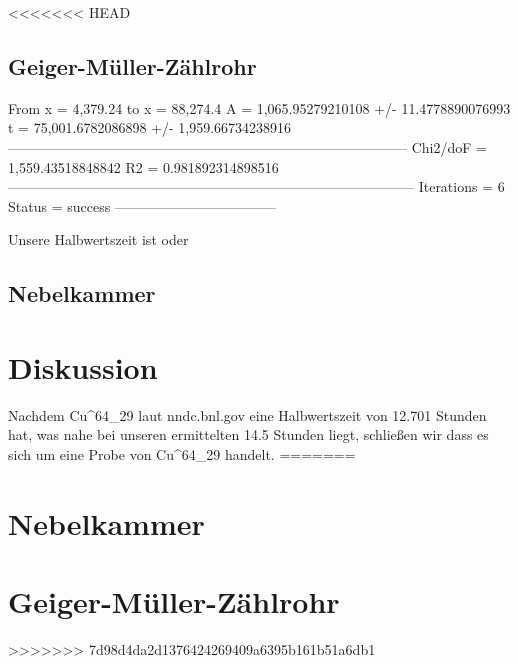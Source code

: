 \documentclass{article}
\begin{document}
<<<<<<< HEAD

\subsection{Geiger-Müller-Zählrohr}
From x = 4,379.24 to x = 88,274.4
A  = 1,065.95279210108 +/- 11.4778890076993
t  = 75,001.6782086898 +/- 1,959.66734238916
--------------------------------------------------------------------------------------
Chi2/doF = 1,559.43518848842
R2 = 0.981892314898516
---------------------------------------------------------------------------------------
Iterations = 6
Status = success
-----------------------------------

Unsere Halbwertszeit ist  oder \\
\subsection{Nebelkammer}
\section{Diskussion}		
Nachdem Cu^{64}_{29} laut nndc.bnl.gov eine Halbwertszeit von 12.701 Stunden hat, was nahe bei unseren ermittelten 14.5 Stunden liegt, schließen wir dass es sich um eine Probe von Cu^{64}_{29} handelt.																		
=======
\section{Nebelkammer}
\section{Geiger-Müller-Zählrohr}																							
>>>>>>> 7d98d4da2d1376424269409a6395b161b51a6db1
\end{document}
